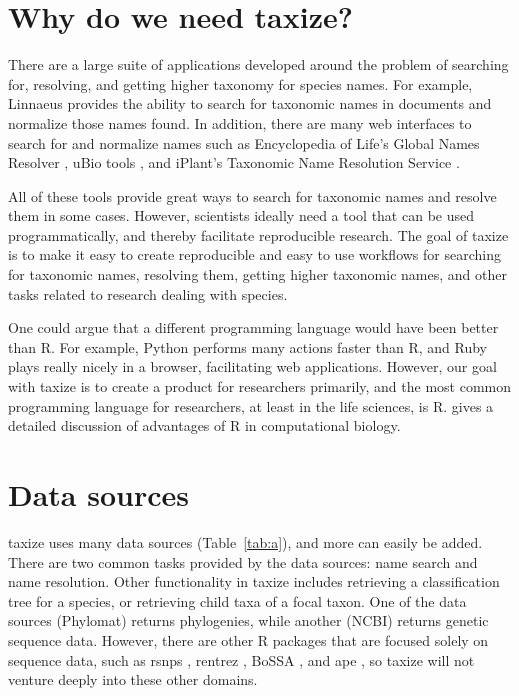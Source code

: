 \documentclass[letterpaper,superscriptaddress,showkeys,longbibliography,10pt]{revtex4-1}\usepackage{graphicx, color}
\begin{document}
\section{Why do we need taxize?}

There are a large suite of applications developed around the problem of searching for, resolving, and getting higher taxonomy for species names. For example, Linnaeus \cite{linnaeus} provides the ability to search for taxonomic names in documents and normalize those names found. In addition, there are many web interfaces to search for and normalize names such as Encyclopedia of Life's Global Names Resolver \cite{eolgnr}, uBio tools \cite{ubio}, and iPlant's Taxonomic Name Resolution Service \cite{tnrs}. 

All of these tools provide great ways to search for taxonomic names and resolve them in some cases. However, scientists ideally need a tool that can be used programmatically, and thereby facilitate reproducible research. The goal of taxize is to make it easy to create reproducible and easy to use workflows for searching for taxonomic names, resolving them, getting higher taxonomic names, and other tasks related to research dealing with species. 

One could argue that a different programming language would have been better than R. For example, Python performs many actions faster than R, and Ruby plays really nicely in a browser, facilitating web applications. However, our goal with taxize is to create a product for researchers primarily, and the most common programming language for researchers, at least in the life sciences, is R. \citet{gentleman_bioconductor:_2004} gives a detailed discussion of advantages of R in computational biology.


\section{Data sources}

taxize uses many data sources (Table~\ref{tab:a}), and more can easily be added. There are two common tasks provided by the data sources: name search and name resolution. Other functionality in taxize includes retrieving a classification tree for a species, or retrieving child taxa of a focal taxon. One of the data sources (Phylomat) returns phylogenies, while another (NCBI) returns genetic sequence data. However, there are other R packages that are focused solely on sequence data, such as rsnps \cite{chamberlain2013}, rentrez \cite{winter2013}, BoSSA \cite{lefeuvre2010}, and ape \cite{paradis2004}, so taxize will not venture deeply into these other domains. 
\end{document}
